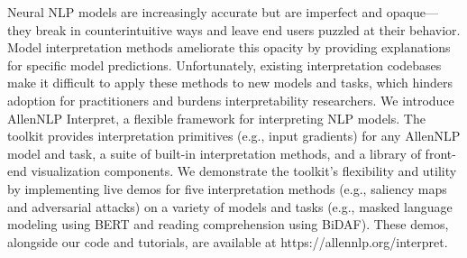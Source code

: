 Neural NLP models are increasingly accurate but are imperfect and opaque---they break in counterintuitive ways and leave end users puzzled at their behavior. 
Model interpretation methods ameliorate this opacity by providing explanations for specific model predictions. Unfortunately, existing interpretation codebases make it difficult to apply these methods to new models and tasks, which hinders adoption for practitioners and burdens interpretability researchers. 
We introduce AllenNLP Interpret, a flexible framework for interpreting NLP models. The toolkit provides interpretation primitives (e.g., input gradients) for any AllenNLP model and task, a suite of built-in interpretation methods, and a library of front-end visualization components.
We demonstrate the toolkit's flexibility and utility by implementing live demos for five interpretation methods (e.g., saliency maps and adversarial attacks) on a variety of models and tasks (e.g., masked language modeling using BERT and reading comprehension using BiDAF). These demos, alongside our code and tutorials, are available at https://allennlp.org/interpret.